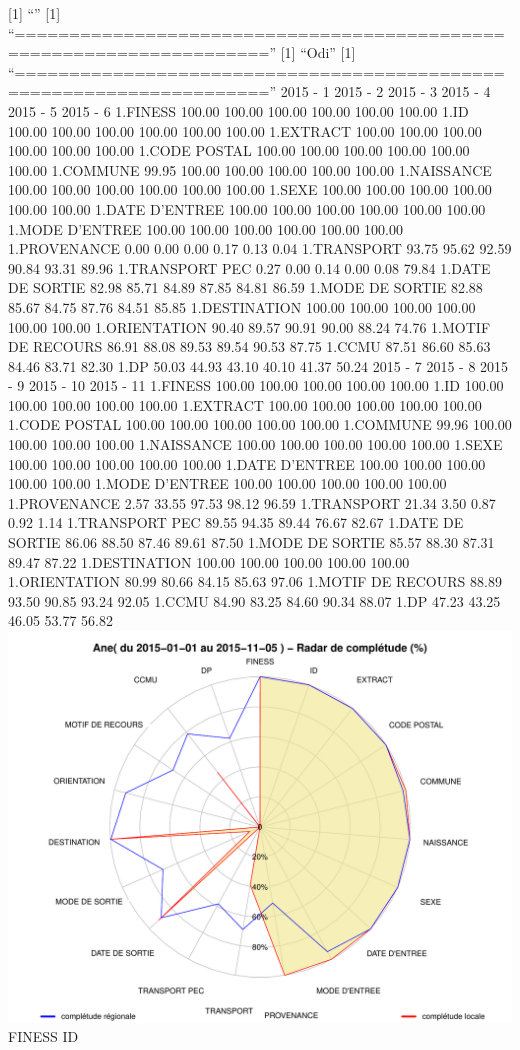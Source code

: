 \documentclass[]{article}
\begin{document}
{[}1{]} ``'' {[}1{]}
``=====================================================================''
{[}1{]} ``Odi'' {[}1{]}
``=====================================================================''
2015 - 1 2015 - 2 2015 - 3 2015 - 4 2015 - 5 2015 - 6 1.FINESS 100.00
100.00 100.00 100.00 100.00 100.00 1.ID 100.00 100.00 100.00 100.00
100.00 100.00 1.EXTRACT 100.00 100.00 100.00 100.00 100.00 100.00 1.CODE
POSTAL 100.00 100.00 100.00 100.00 100.00 100.00 1.COMMUNE 99.95 100.00
100.00 100.00 100.00 100.00 1.NAISSANCE 100.00 100.00 100.00 100.00
100.00 100.00 1.SEXE 100.00 100.00 100.00 100.00 100.00 100.00 1.DATE
D'ENTREE 100.00 100.00 100.00 100.00 100.00 100.00 1.MODE D'ENTREE
100.00 100.00 100.00 100.00 100.00 100.00 1.PROVENANCE 0.00 0.00 0.00
0.17 0.13 0.04 1.TRANSPORT 93.75 95.62 92.59 90.84 93.31 89.96
1.TRANSPORT PEC 0.27 0.00 0.14 0.00 0.08 79.84 1.DATE DE SORTIE 82.98
85.71 84.89 87.85 84.81 86.59 1.MODE DE SORTIE 82.88 85.67 84.75 87.76
84.51 85.85 1.DESTINATION 100.00 100.00 100.00 100.00 100.00 100.00
1.ORIENTATION 90.40 89.57 90.91 90.00 88.24 74.76 1.MOTIF DE RECOURS
86.91 88.08 89.53 89.54 90.53 87.75 1.CCMU 87.51 86.60 85.63 84.46 83.71
82.30 1.DP 50.03 44.93 43.10 40.10 41.37 50.24 2015 - 7 2015 - 8 2015 -
9 2015 - 10 2015 - 11 1.FINESS 100.00 100.00 100.00 100.00 100.00 1.ID
100.00 100.00 100.00 100.00 100.00 1.EXTRACT 100.00 100.00 100.00 100.00
100.00 1.CODE POSTAL 100.00 100.00 100.00 100.00 100.00 1.COMMUNE 99.96
100.00 100.00 100.00 100.00 1.NAISSANCE 100.00 100.00 100.00 100.00
100.00 1.SEXE 100.00 100.00 100.00 100.00 100.00 1.DATE D'ENTREE 100.00
100.00 100.00 100.00 100.00 1.MODE D'ENTREE 100.00 100.00 100.00 100.00
100.00 1.PROVENANCE 2.57 33.55 97.53 98.12 96.59 1.TRANSPORT 21.34 3.50
0.87 0.92 1.14 1.TRANSPORT PEC 89.55 94.35 89.44 76.67 82.67 1.DATE DE
SORTIE 86.06 88.50 87.46 89.61 87.50 1.MODE DE SORTIE 85.57 88.30 87.31
89.47 87.22 1.DESTINATION 100.00 100.00 100.00 100.00 100.00
1.ORIENTATION 80.99 80.66 84.15 85.63 97.06 1.MOTIF DE RECOURS 88.89
93.50 90.85 93.24 92.05 1.CCMU 84.90 83.25 84.60 90.34 88.07 1.DP 47.23
43.25 46.05 53.77 56.82
\includegraphics{completude_files/figure-latex/finess-14.pdf} FINESS ID
\end{document}
